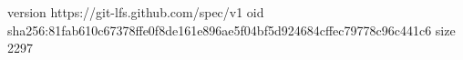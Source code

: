 version https://git-lfs.github.com/spec/v1
oid sha256:81fab610c67378ffe0f8de161e896ae5f04bf5d924684cffec79778c96c441c6
size 2297
